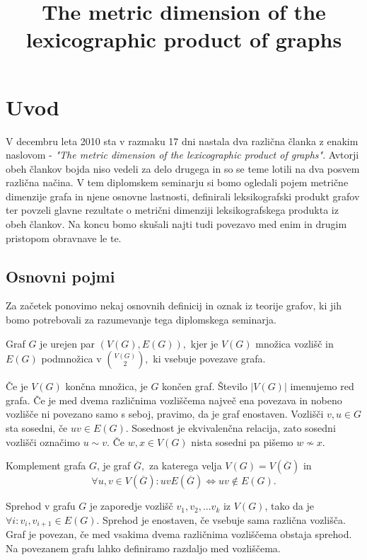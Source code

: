 \documentclass[mat1, tisk]{fmfdelo}
\title{The metric dimension of the lexicographic product of graphs}
\begin{document}
\section{Uvod}
V decembru leta 2010 sta v razmaku 17 dni nastala dva različna članka z enakim naslovom - 
\textit{"The metric dimension of the lexicographic product of graphs"}. Avtorji obeh člankov 
bojda niso vedeli za delo drugega in so se teme lotili na dva posvem različna načina. 
V tem diplomskem seminarju si bomo ogledali pojem metrične dimenzije grafa in njene osnovne 
lastnosti, definirali leksikografski produkt grafov ter povzeli glavne rezultate o metrični 
dimenziji leksikografskega produkta iz obeh člankov. Na koncu bomo skušali najti tudi 
povezavo med enim in drugim pristopom obravnave le te. 




\subsection{Osnovni pojmi} \label{ss:osnovni_pojmi}
Za začetek ponovimo nekaj osnovnih definicij in oznak iz teorije grafov, ki jih bomo potrebovali 
za razumevanje tega diplomskega seminarja. 

\begin{definicija} \label{def:graf}
    Graf $G$ je urejen par $(V(G), E(G)),$ kjer je $V(G)$ množica vozlišč in $E(G)$ 
    podmnožica v $\binom{V(G)}{2},$ ki vsebuje povezave grafa.
\end{definicija}

Če je $V(G)$ končna množica, je $G$ končen graf. Število $|V(G)|$ imenujemo red grafa. 
Če je med dvema različnima vozliščema največ ena povezava in nobeno vozlišče ni povezano samo 
s seboj, pravimo, da je graf enostaven. Vozlišči $v, u \in G$ sta sosedni, če $uv \in E(G).$ 
Sosednost je ekvivalenčna relacija, zato sosedni vozlišči označimo $u \sim v.$ Če $w, x \in V(G)$ 
nista sosedni pa pišemo $w \not \sim x.$

\begin{definicija} \label{def:komplement}
    Komplement grafa $G$, je graf $\overline{G},$ za katerega velja $V(G) = V(\overline{G})$ in 
    $$\forall u,v \in V(\overline{G}): uv E(\overline{G}) \Leftrightarrow uv \not \in E(G).$$
\end{definicija}

Sprehod v grafu $G$ je zaporedje vozlišč $v_1, v_2, ... v_k$ iz $V(G)$, tako da je 
$\forall i : v_i, v_{i+1} \in E(G).$ Sprehod je enostaven, če vsebuje sama različna vozlišča.
Graf je povezan, če med vsakima dvema različnima vozliščema obstaja sprehod. Na povezanem
grafu lahko definiramo razdaljo med vozliščema.
\end{document}
